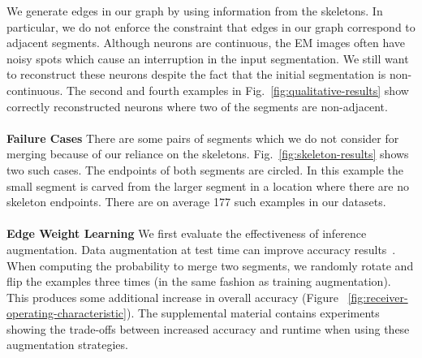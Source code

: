We generate edges in our graph by using information from the skeletons. 
In particular, we do not enforce the constraint that edges in our graph correspond to adjacent segments.
Although neurons are continuous, the EM images often have noisy spots which cause an interruption in the input segmentation.
We still want to reconstruct these neurons despite the fact that the initial segmentation is non-continuous. 
The second and fourth examples in Fig.~\ref{fig:qualitative-results} show correctly reconstructed neurons where two of the segments are non-adjacent. 
\\~\\
\noindent\textbf{Failure Cases}
There are some pairs of segments which we do not consider for merging because of our reliance on the skeletons.
Fig.~\ref{fig:skeleton-results} shows two such cases. 
The endpoints of both segments are circled.
In this example the small segment is carved from the larger segment in a location where there are no skeleton endpoints. 
There are on average 177 such examples in our datasets.
\\~\\
\noindent\textbf{Edge Weight Learning}
We first evaluate the effectiveness of inference augmentation.
Data augmentation at test time can improve accuracy results~\cite{zeng2017deepem3d,lee2017superhuman}.
When computing the probability to merge two segments, we randomly rotate and flip the examples three times (in the same fashion as training augmentation).
This produces some additional increase in overall accuracy (Figure ~\ref{fig:receiver-operating-characteristic}).
The supplemental material contains experiments showing the trade-offs between increased accuracy and runtime when using these augmentation strategies.

